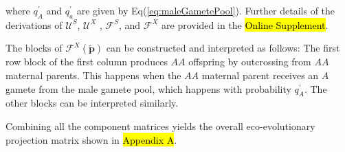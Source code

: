 \documentclass[11pt,draft]{article}
\def\mbf#1{\mathbf{#1}}
\def\mcal#1{\mathcal{#1}}
\begin{document}
\noindent where $q^{\prime}_A$ and $q^{\prime}_a$ are given by Eq(\ref{eq:maleGametePool}). Further details of the derivations of $\mcal{U}^S$, $\mcal{U}^X$ ,  $\mcal{F}^S$, and $\mcal{F}^X$ are provided in the \hl{Online Supplement}. 

The blocks of $\mcal{F}^X(\tilde{\mbf{p}})$ can be constructed and interpreted as follows: The first row block of the first column produces $AA$ offspring by outcrossing from $AA$ maternal parents. This happens when the $AA$ maternal parent receives an $A$ gamete from the male gamete pool, which happens with probability $q^{\prime}_{A}$. The other blocks can be interpreted similarly.

Combining all the component matrices yields the overall eco-evolutionary projection matrix shown in \hl{Appendix A}.
\end{document}
